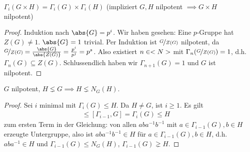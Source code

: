 \begin{proposition}
	$\Gamma_i(G\times H) = \Gamma_i(G)\times \Gamma_i(H)$ (impliziert $G,H$ nilpotent $\implies G \times H$ nilpotent)
\end{proposition}
\begin{proof}
	Induktion nach $\abs{G} = p^i$. Wir haben gesehen: Eine $p$-Gruppe hat $Z(G)\neq 1$. $\abs{G} = 1$ trivial. Per Induktion ist $\lnkset{G}{Z(G)}$ nilpotent, da $\lnkset{G}{Z(G)} = \frac{\abs{G}}{\abs{Z(G)}} = \frac{p^i}{p^j} = p^s$. Also existiert $n \in <N>$ mit $\Gamma_n(\lnkset{G}{Z(G)}) = 1$, d.h. $\Gamma_n(G) \subseteq Z(G)$. Schlussendlich haben wir $\Gamma_{n+1}(G) = 1$ und $G$ ist nilpotent.
\end{proof}
\begin{lemma}
	$G$ nilpotent, $H \lneq G \implies H \lneq N_G(H)$.
\end{lemma}
\begin{proof}
	Sei $i$ minimal mit $\Gamma_i(G) \le H$. Da $H \neq G$, ist $i \ge 1$. Es gilt 
	\begin{align*}
		[\Gamma_{i-1}(G),H] \le [\Gamma_{i-1},G] = \Gamma_i(G) \le H
	\end{align*}
	zum ersten Term in der Gleichung: von allen $aba^{-1}b^{-1}$ mit $a\in \Gamma_{i-1}(G),b \in H$ erzeugte Untergruppe, also ist $aba^{-1}b^{-1} \in H$ für $a \in \Gamma_{i-1}(G), b \in H$, d.h. $aba^{-1} \in H$ und $\Gamma_{i-1}(G) \le N_G(H)$, $\Gamma_{i-1}(G) \gneq H$. 
\end{proof}
